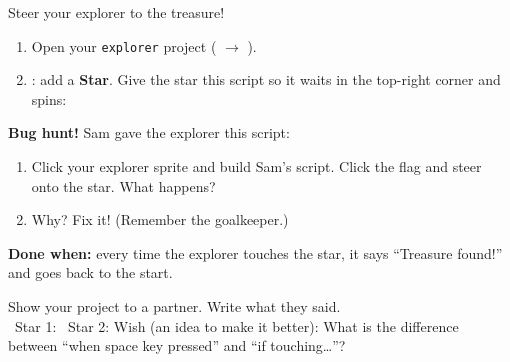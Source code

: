 \begin{exercise}
Steer your explorer to the treasure!
\begin{enumerate}[leftmargin=1.4em,itemsep=1pt]
  \item Open your \texttt{explorer} project ( $\rightarrow$ ).
  \item {}: add a \textbf{Star}. Give the star this script so it waits in the top-right corner and spins:
\end{enumerate}
\begin{center}
\begin{scratch}[scale=0.8]
\end{scratch}
\hspace{1cm}
\begin{minipage}[t]{0.5\linewidth}
\textbf{Bug hunt!} Sam gave the explorer this script:\\[3pt]
\begin{scratch}[scale=0.75]
\end{scratch}
\end{minipage}
\end{center}
\begin{enumerate}[leftmargin=1.4em,itemsep=1pt,start=3]
  \item Click your explorer sprite and build Sam's script. Click the flag and steer onto the star. What happens? 
  \item Why? Fix it! (Remember the goalkeeper.) 
\end{enumerate}
\textbf{Done when:} every time the explorer touches the star, it says \enquote{Treasure found!} and goes back to the start.
\end{exercise}

\begin{vocab}
\end{vocab}

\begin{reflection}
Show your project to a partner. Write what they said.\\[4pt]
\faStar\ Star 1: 
\faStar\ Star 2: 
Wish (an idea to make it better): 
What is the difference between \enquote{when space key pressed} and \enquote{if touching\ldots}? 
\end{reflection}
